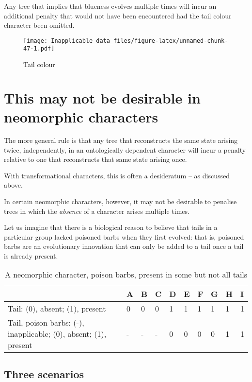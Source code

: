 \documentclass[]{book}
\theoremstyle{definition}
\theoremstyle{definition}
\theoremstyle{definition}
\theoremstyle{remark}
\begin{document}
Any tree that implies that blueness evolves multiple times will incur an
additional penalty that would not have been encountered had the tail
colour character been omitted.

\begin{figure}
\centering
\texttt{[image: Inapplicable\_data\_files/figure-latex/unnamed-chunk-47-1.pdf]}
\caption{\label{fig:unnamed-chunk-47}Tail colour}
\end{figure}

\hypertarget{this-may-not-be-desirable-in-neomorphic-characters}{%
\section{This may not be desirable in neomorphic
characters}\label{this-may-not-be-desirable-in-neomorphic-characters}}

The more general rule is that any tree that reconstructs the same state
arising twice, independently, in an ontologically dependent character
will incur a penalty relative to one that reconstructs that same state
arising once.

With transformational characters, this is often a desideratum -- as
discussed above.

In certain neomorphic characters, however, it may not be desirable to
penalise trees in which the \emph{absence} of a character arises
multiple times.

Let us imagine that there is a biological reason to believe that tails
in a particular group lacked poisoned barbs when they first evolved:
that is, poisoned barbs are an evolutionary innovation that can only be
added to a tail once a tail is already present.

\begin{table}

\caption{\label{tab:unnamed-chunk-48}A neomorphic character, poison barbs, present in some but not all tails}
\centering
\begin{tabular}[t]{l|l|l|l|l|l|l|l|l|l}
\hline
  & A & B & C & D & E & F & G & H & I\\
\hline
Tail: (0), absent; (1), present & 0 & 0 & 0 & 1 & 1 & 1 & 1 & 1 & 1\\
\hline
Tail, poison barbs: (-), inapplicable; (0), absent; (1), present & - & - & - & 0 & 0 & 0 & 0 & 1 & 1\\
\hline
\end{tabular}
\end{table}

\hypertarget{three-scenarios}{%
\subsection{Three scenarios}\label{three-scenarios}}
\end{document}
